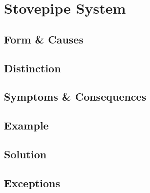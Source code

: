 \section{Stovepipe System}

\subsection{Form \& Causes}

\subsection{Distinction}

\subsection{Symptoms \& Consequences}

\subsection{Example}

\subsection{Solution}

\subsection{Exceptions}